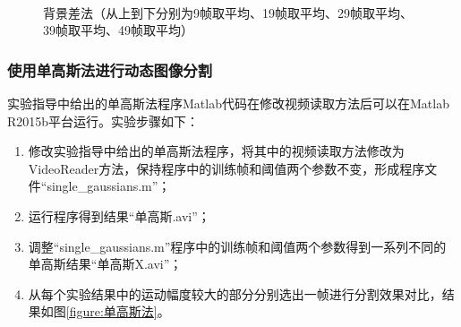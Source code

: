 \documentclass[a4paper]{ctexart}
\begin{document}
\begin{enumerate}[label=\arabic*、]
\begin{figure}[htbp]
\begin{minipage}[t]{0.2\textwidth}
		\end{minipage}\\
		\caption{背景差法（从上到下分别为9帧取平均、19帧取平均、29帧取平均、39帧取平均、49帧取平均）}\label{figure:时间平均法}
	\end{figure}
\end{enumerate}
\subsubsection{使用单高斯法进行动态图像分割}
实验指导中给出的单高斯法程序Matlab代码在修改视频读取方法后可以在Matlab R2015b平台运行。实验步骤如下：
\begin{enumerate}[label=\arabic*、]
	\item 修改实验指导中给出的单高斯法程序，将其中的视频读取方法修改为VideoReader方法，保持程序中的训练帧和阈值两个参数不变，形成程序文件\newline“single\_gaussians.m”；
	\item 运行程序得到结果“单高斯.avi”；
	\item 调整“single\_gaussians.m”程序中的训练帧和阈值两个参数得到一系列不同的单高斯结果“单高斯X.avi”；
	\item 从每个实验结果中的运动幅度较大的部分分别选出一帧进行分割效果对比，结果如图\ref{figure:单高斯法}。
\end{enumerate}
\end{document}
